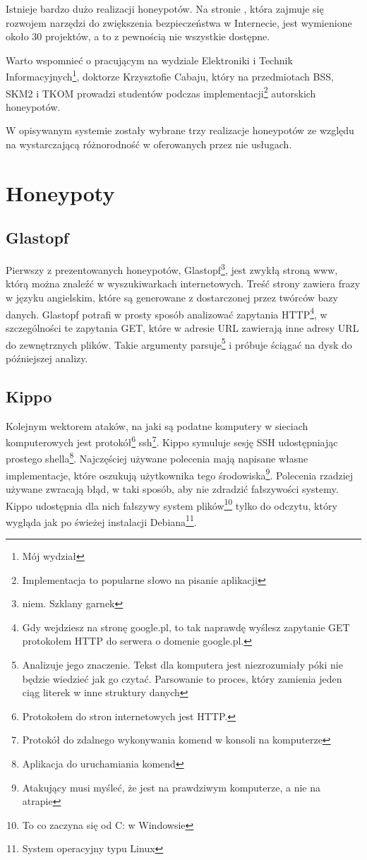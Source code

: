 \documentclass[runningheads,a4paper]{llncs}
\begin{document}
Istnieje bardzo dużo realizacji honeypotów. Na stronie \cite{honeynet_project}, która zajmuje się rozwojem narzędzi do zwiększenia bezpieczeństwa w Internecie, jest wymienione około 30 projektów, a to z pewnością nie wszystkie dostępne.

Warto wspomnieć o pracującym na wydziale Elektroniki i Technik Informacyjnych\footnote{Mój wydział}, doktorze Krzysztofie Cabaju, który na przedmiotach BSS, SKM2 i TKOM prowadzi studentów podczas implementacji\footnote{Implementacja to popularne słowo na pisanie aplikacji} autorskich honeypotów.

W opisywanym systemie zostały wybrane trzy realizacje honeypotów ze względu na wystarczającą różnorodność w oferowanych przez nie usługach.

\section{Honeypoty}

\subsection{Glastopf}
Pierwszy z prezentowanych honeypotów, Glastopf\footnote{niem. Szklany garnek}, jest zwykłą stroną www, którą można znaleźć w wyszukiwarkach internetowych. Treść strony zawiera frazy w języku angielskim, które są generowane z dostarczonej przez twórców bazy danych. Glastopf potrafi w prosty sposób analizować zapytania HTTP\footnote{Gdy wejdziesz na stronę google.pl, to tak naprawdę wyślesz zapytanie GET protokołem HTTP do serwera o domenie google.pl.}, w szczególności te zapytania GET, które w adresie URL zawierają inne adresy URL do zewnętrznych plików. Takie argumenty parsuje\footnote{Analizuje jego znaczenie. Tekst dla komputera jest niezrozumiały póki nie będzie wiedzieć jak go czytać. Parsowanie to proces, który zamienia jeden ciąg literek w inne struktury danych} i próbuje ściągać na dysk do późniejszej analizy.

\subsection{Kippo}

Kolejnym wektorem ataków, na jaki są podatne komputery w sieciach komputerowych jest protokół\footnote{Protokołem do stron internetowych jest HTTP.} ssh\footnote{Protokół do zdalnego wykonywania komend w konsoli na komputerze}. Kippo symuluje sesję SSH udostępniając prostego shella\footnote{Aplikacja do uruchamiania komend}. Najczęściej używane polecenia mają napisane własne implementacje, które oszukują użytkownika tego środowiska\footnote{Atakujący musi myśleć, że jest na prawdziwym komputerze, a nie na atrapie}. Polecenia rzadziej używane zwracają błąd, w taki sposób, aby nie zdradzić fałszywości systemy. Kippo udostępnia dla nich fałszywy system plików\footnote{To co zaczyna się od C: w Windowsie} tylko do odczytu, który wygląda jak po świeżej instalacji Debiana\footnote{System operacyjny typu Linux}.
\end{document}
